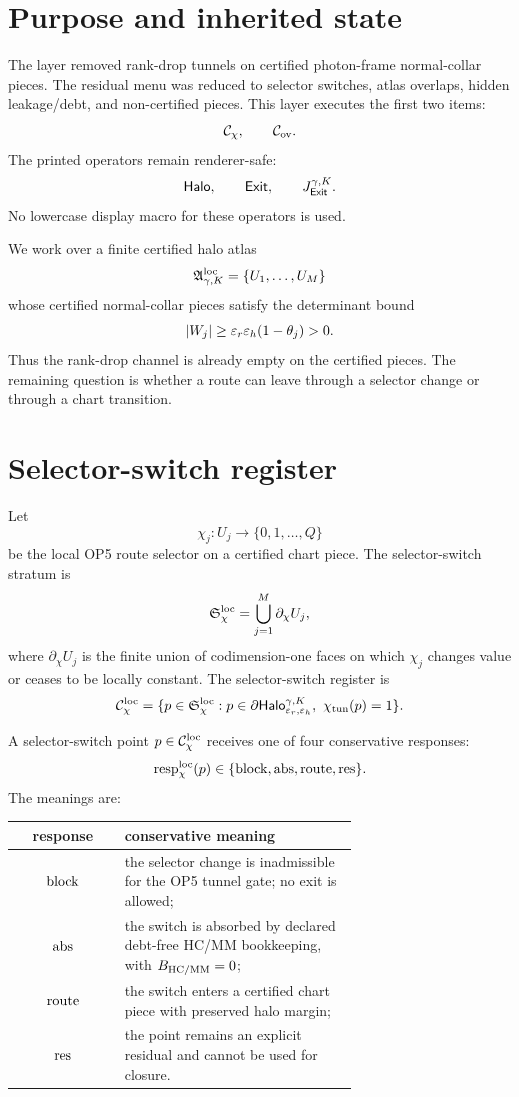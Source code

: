 \section{Purpose and inherited state}

The layer removed rank-drop tunnels on certified photon-frame normal-collar pieces. The residual menu was reduced to selector switches, atlas overlaps, hidden leakage/debt, and non-certified pieces. This layer executes the first two items:
\[
\mathcal C_{\chi},\qquad \mathcal C_{\mathrm{ov}}.
\]
The printed operators remain renderer-safe:
\[
\mathsf{Halo},\qquad \mathsf{Exit},\qquad J_{\mathsf{Exit}}^{\gamma,K} .
\]
No lowercase display macro for these operators is used.

We work over a finite certified halo atlas
\[
\mathfrak A_{\gamma,K}^{\mathrm{loc}}=\{U_1,\ldots,U_M\}
\]
whose certified normal-collar pieces satisfy the determinant bound
\[
|W_j|\ge \varepsilon_r\varepsilon_h(1-\theta_j)>0.
\]
Thus the rank-drop channel is already empty on the certified pieces. The remaining question is whether a route can leave through a selector change or through a chart transition.

\section{Selector-switch register}

\begin{definition}
Let
\[
\chi_j:U_j\longrightarrow \{0,1,\ldots,Q\}
\]
be the local OP5 route selector on a certified chart piece. The selector-switch stratum is
\[
\mathfrak S_{\chi}^{\mathrm{loc}}=
\bigcup_{j=1}^{M}\partial_{\chi}U_j,
\]
where \(\partial_{\chi}U_j\) is the finite union of codimension-one faces on which \(\chi_j\) changes value or ceases to be locally constant. The selector-switch register is
\[
\Cchi=
\{p\in \Ssel:
 p\in\partial\HaloOp_{\epsr,\epsh}^{\gamma,K},\ \chi_{\tun}(p)=1\}.
\]
\end{definition}

\begin{definition}
A selector-switch point \(p\in\mathcal C_{\chi}^{\mathrm{loc}}\) receives one of four conservative responses:
\[
\mathrm{resp}_{\chi}^{\mathrm{loc}}(p)\in
\{\mathrm{block},\mathrm{abs},\mathrm{route},\mathrm{res}\}.
\]
The meanings are:
\begin{center}
\begin{tabular}{c|P{0.68\linewidth}}
\toprule
response & conservative meaning\\
\midrule
\(\mathrm{block}\) & the selector change is inadmissible for the OP5 tunnel gate; no exit is allowed;\\
\(\mathrm{abs}\) & the switch is absorbed by declared debt-free HC/MM bookkeeping, with \(B_{\mathrm{HC}/\mathrm{MM}}=0\);\\
\(\mathrm{route}\) & the switch enters a certified chart piece with preserved halo margin;\\
\(\mathrm{res}\) & the point remains an explicit residual and cannot be used for closure.\\
\bottomrule
\end{tabular}
\end{center}
\end{definition}


